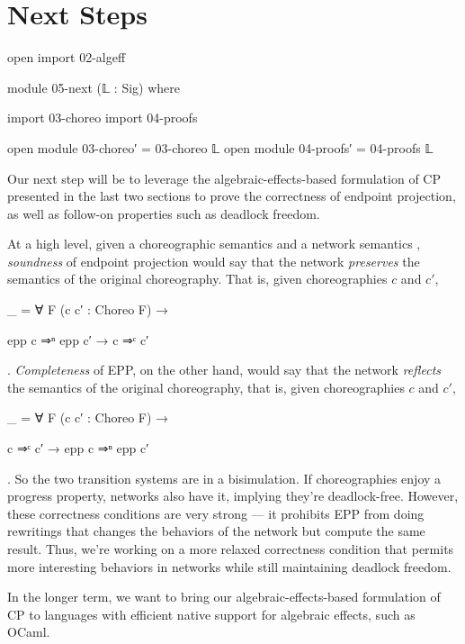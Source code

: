\section{Next Steps}
\label{sec:next}

\begin{code}[hide]
open import 02-algeff

module 05-next (𝕃 : Sig) where

import 03-choreo
import 04-proofs

open module 03-choreo′ = 03-choreo 𝕃
open module 04-proofs′ = 04-proofs 𝕃

\end{code}

Our next step will be to leverage the algebraic-effects-based formulation of CP presented in the last two sections to prove the correctness of endpoint projection, as well as follow-on properties such as deadlock freedom.

At a high level, given a choreographic semantics  and a network semantics , \emph{soundness} of endpoint projection would say that the network \emph{preserves} the semantics of the original choreography.
%
That is, given choreographies $c$ and $c'$,
%
\begin{code}[hide]
_ = ∀ {F} (c c′ : Choreo F) →
\end{code}
%
\begin{code}[inline]
  epp c ⇒ⁿ epp c′ → c ⇒ᶜ c′
\end{code}.
%
\emph{Completeness} of EPP, on the other hand, would say that the network \emph{reflects} the semantics of the original choreography, that is, given choreographies $c$ and $c′$,
%
\begin{code}[hide]
_ = ∀ {F} (c c′ : Choreo F) →
\end{code}
%
\begin{code}[inline]
  c ⇒ᶜ c′ → epp c ⇒ⁿ epp c′
\end{code}.
%
So the two transition systems are in a bisimulation.
%
If choreographies enjoy a progress property, networks also have it, implying they're deadlock-free.
%
However, these correctness conditions are very strong --- it prohibits EPP from doing rewritings that changes the behaviors of the network but compute the same result.
%
Thus, we're working on a more relaxed correctness condition that permits more interesting behaviors in networks while still maintaining deadlock freedom.

In the longer term, we want to bring our algebraic-effects-based formulation of CP to languages with efficient native support for algebraic effects, such as OCaml.

